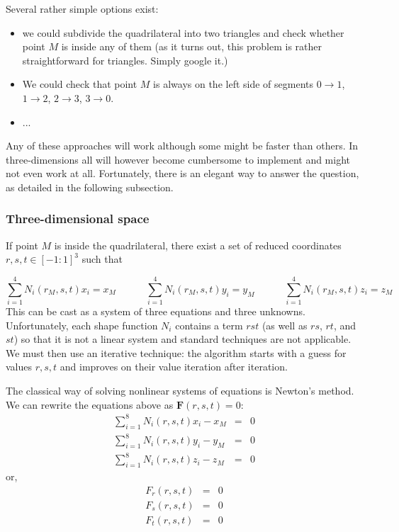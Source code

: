Several rather simple options exist:
\begin{itemize}
\item we could subdivide the quadrilateral into two triangles and check whether point $M$ is inside any of them (as it turns out, 
this problem is rather straightforward for triangles. Simply google it.)
\item We could check that point $M$ is always on the left side of segments $0\rightarrow 1$, $1\rightarrow 2$, $2\rightarrow 3$, $3\rightarrow 0$.
\item ...  
\end{itemize}

Any of these approaches will work although some might be faster than others. In three-dimensions all will however become 
cumbersome to implement and might not even work at all. Fortunately, there is an elegant way to answer the question, as 
detailed in the following subsection.

\subsubsection{Three-dimensional space}

If point $M$ is inside the quadrilateral, there exist a set of reduced coordinates $r,s,t\in[-1:1]^3$ such that 

\[
\sum_{i=1}^4 N_i(r_M,s,t) x_i = x_M
\quad\quad\quad
\sum_{i=1}^4 N_i(r_M,s,t) y_i = y_M
\quad\quad\quad
\sum_{i=1}^4 N_i(r_M,s,t) z_i = z_M
\]
This can be cast as a system of three equations and three unknowns. Unfortunately, each shape function $N_i$ 
contains a term $rst$ (as well as $rs$, $rt$, and $st$) so that it is not a linear system and standard techniques
are not applicable. 
We must then use an iterative technique: the algorithm starts with a guess for values $r,s,t$ and 
improves on their value iteration after iteration. 

The classical way of solving nonlinear systems of equations is Newton's method. 
We can rewrite the equations above as ${\bm F}(r,s,t)=0$:
\begin{eqnarray}
\sum_{i=1}^8 N_i(r,s,t) x_i - x_M&=&0 \nonumber\\
\sum_{i=1}^8 N_i(r,s,t) y_i - y_M&=&0 \nonumber\\
\sum_{i=1}^8 N_i(r,s,t) z_i - z_M&=&0
\end{eqnarray}
or,
\begin{eqnarray}
F_r(r,s,t)&=&0 \nonumber\\
F_s(r,s,t)&=&0 \nonumber\\
F_t(r,s,t)&=&0 \nonumber
\end{eqnarray}

